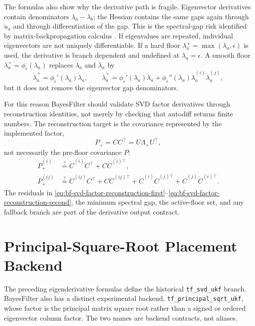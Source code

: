 The formulas also show why the derivative path is fragile.  Eigenvector
derivatives contain denominators $\lambda_a-\lambda_b$; the Hessian contains
the same gaps again through $\dot u_a$ and through differentiation of the gap.
This is the spectral-gap risk identified by matrix-backpropagation calculus
\citep{ionescu2015matrixbackprop}.  If eigenvalues are repeated, individual
eigenvectors are not uniquely differentiable.  If a hard floor
$\lambda_a^+=\max(\lambda_a,\epsilon)$ is used, the derivative is branch
dependent and undefined at $\lambda_a=\epsilon$.  A smooth floor
$\lambda_a^+=\phi_\epsilon(\lambda_a)$ replaces
$\dot\lambda_a$ and $\ddot\lambda_a$ by
\[
  \dot\lambda_a^+=\phi_\epsilon'(\lambda_a)\dot\lambda_a,\qquad
  \ddot\lambda_a^+
  =
  \phi_\epsilon'(\lambda_a)\ddot\lambda_a
  +\phi_\epsilon''(\lambda_a)\dot\lambda_a^{(i)}\dot\lambda_a^{(j)},
\]
but it does not remove the eigenvector gap denominators.

For this reason BayesFilter should validate SVD factor derivatives through
reconstruction identities, not merely by checking that autodiff returns finite
numbers.  The reconstruction target is the covariance represented by the
implemented factor,
\[
  P_+ = CC^\top=U\Lambda_+U^\top,
\]
not necessarily the pre-floor covariance $P$:
\begin{align}
\label{eq:bf-svd-factor-reconstruction-first}
  \dot P_+^{(i)}
  &\stackrel{?}{=}
  \dot C^{(i)}C^\top+C\dot C^{(i)\top},\\
\label{eq:bf-svd-factor-reconstruction-second}
  \ddot P_+^{(ij)}
  &\stackrel{?}{=}
  \ddot C^{(ij)}C^\top+C\ddot C^{(ij)\top}
  +\dot C^{(i)}\dot C^{(j)\top}
  +\dot C^{(j)}\dot C^{(i)\top}.
\end{align}
The residuals in
\eqref{eq:bf-svd-factor-reconstruction-first}--\eqref{eq:bf-svd-factor-reconstruction-second},
the minimum spectral gap, the active-floor set, and any fallback branch are part
of the derivative output contract.

\section{Principal-Square-Root Placement Backend}
\label{sec:bf-svd-principal-sqrt-backend}

The preceding eigenderivative formulas define the historical
\texttt{tf\_svd\_ukf} branch.  BayesFilter also has a distinct experimental
backend, \texttt{tf\_principal\_sqrt\_ukf}, whose factor is the principal
matrix square root rather than a signed or ordered eigenvector column factor.
The two names are backend contracts, not aliases.

